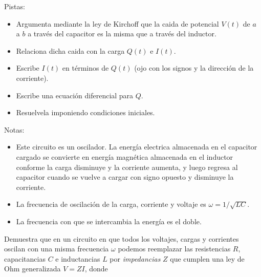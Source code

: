 \documentclass{exam}
\begin{document}
\begin{questions}

  Pistas:
  \begin{itemize}
  \item Argumenta mediante la ley de Kirchoff que la caida de potencial $V(t)$ de
    $a$ a $b$ a través del capacitor es la misma que a
    través del inductor.
  \item Relaciona dicha caida con la carga $Q(t)$ e $I(t)$.
  \item Escribe $I(t)$ en términos de $Q(t)$ (ojo con los signos y la
    dirección de la corriente).
  \item Escribe una ecuación diferencial para $Q$.
  \item Resuelvela imponiendo condiciones iniciales.
  \end{itemize}
  Notas:
  \begin{itemize}
  \item Este circuito es un oscilador. La energía electrica
    almacenada en el capacitor cargado se convierte en energía
    magnética almacenada en el inductor conforme la carga disminuye y
    la corriente aumenta, y luego regresa al capacitor cuando se
    vuelve a cargar con signo opuesto y disminuye la corriente.
  \item La frecuencia de oscilación de la carga, corriente y voltaje
    es $\omega=1/\sqrt{LC}$.
  \item La frecuencia con que se intercambia la energía es el doble.
  \end{itemize}

  \question Demuestra que en un circuito en que todos los voltajes,
  cargas y corrientes oscilan con una misma frecuencia $\omega$ podemos
  reemplazar las resistencias $R$,  capacitancias $C$ e inductancias
  $L$ por {\em impedancias} $Z$ que cumplen una ley de Ohm
  generalizada $V=ZI$, donde
\end{questions}
\end{document}
